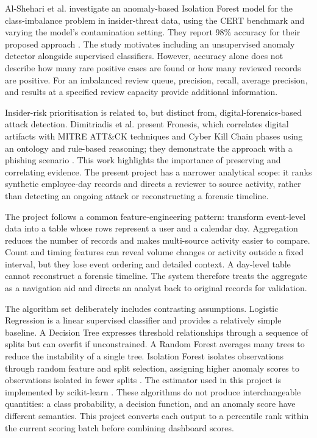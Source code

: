 Al-Shehari et al. investigate an anomaly-based Isolation Forest model
for the class-imbalance problem in insider-threat data, using the CERT
benchmark and varying the model's contamination setting. They report
98\% accuracy for their proposed approach
\cite{alshehari2023isolation}. The study motivates including an
unsupervised anomaly detector alongside supervised classifiers.
However, accuracy alone does not describe how many rare positive cases
are found or how many reviewed records are positive. For an imbalanced
review queue, precision, recall, average precision, and results at a
specified review capacity provide additional information.

Insider-risk prioritisation is related to, but distinct from,
digital-forensics-based attack detection. Dimitriadis et al. present
Fronesis, which correlates digital artifacts with MITRE ATT\&CK
techniques and Cyber Kill Chain phases using an ontology and
rule-based reasoning; they demonstrate the approach with a phishing
scenario \cite{dimitriadis2023fronesis}. This work highlights the
importance of preserving and correlating evidence. The present project
has a narrower analytical scope: it ranks synthetic employee-day
records and directs a reviewer to source activity, rather than
detecting an ongoing attack or reconstructing a forensic timeline.

The project follows a common feature-engineering pattern: transform
event-level data into a table whose rows represent a user and a
calendar day. Aggregation reduces the number of records and makes
multi-source activity easier to compare. Count and timing features can
reveal volume changes or activity outside a fixed interval, but they
lose event ordering and detailed context. A day-level table cannot
reconstruct a forensic timeline. The system therefore treats the
aggregate as a navigation aid and directs an analyst back to original
records for validation.

The algorithm set deliberately includes contrasting assumptions.
Logistic Regression is a linear supervised classifier and provides a
relatively simple baseline. A Decision Tree expresses threshold
relationships through a sequence of splits but can overfit if
unconstrained. A Random Forest averages many trees to reduce the
instability of a single tree. Isolation Forest isolates observations
through random feature and split selection, assigning higher anomaly
scores to observations isolated in fewer splits
\cite{liu2008isolation}. The estimator used in this project is
implemented by scikit-learn \cite{sklearn}. These algorithms do not
produce interchangeable quantities: a class probability, a decision
function, and an anomaly score have different semantics. This project
converts each output to a percentile rank within the current scoring
batch before combining dashboard scores.

